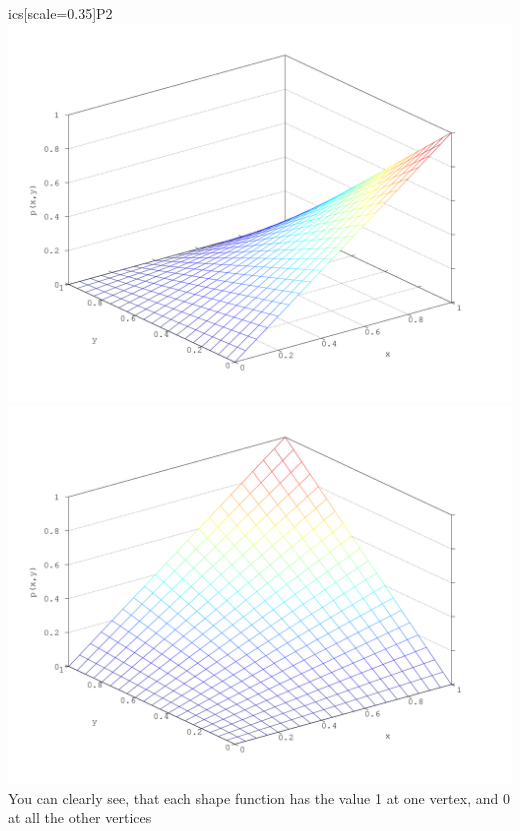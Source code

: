 \documentclass[a4paper,12pt]{article}
\begin{document}
ics[scale=0.35]{P2} \includegraphics[scale=0.35]{P3} \includegraphics[scale=0.35]{P4}
You can clearly see, that each shape function has the value 1 at one vertex, and 0 at all the other vertices
\end{document}
